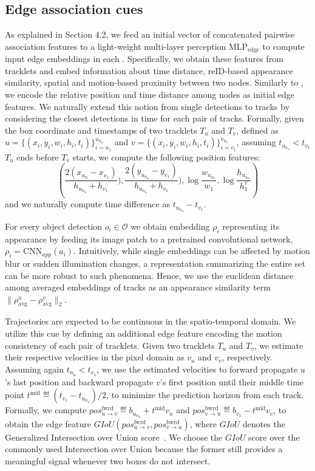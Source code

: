 \documentclass[10pt,twocolumn,letterpaper]{article}
\begin{document}
{{\subsection{Edge association cues}
As explained in Section 4.2, we feed an initial vector of concatenated pairwise association features to a light-weight multi-layer perception $\text{MLP}_{\text{edge}}$ to compute input edge embeddings in each \blockname. Specifically, we obtain these features from tracklets and embed information about time distance, reID-based appearance similarity, spatial and motion-based proximity between two nodes. 
 Similarly to \cite{mpntrack}, we encode the relative position and time distance among nodes as initial edge features. We naturally extend this notion from single detections to tracks by considering the closest detections in time for each pair of tracks. Formally, given the box coordinate and timestamps of two tracklets $T_u$ and $T_v$, defined as 
$u=\{(x_i, y_i, w_i, h_i, t_i)\}_{i=u_1}^{u_{n_u}}$ and
$v=\{(x_i, y_i, w_i, h_i, t_i)\}_{i=v_1}^{v_{n_v}}$, assuming $t_{u_{n_u}}< t_{v_1}$ \ie $T_u$ ends before $T_v$ starts, we compute the following position features:
$$ \left ( \frac{2(x_{n_u} - x_{v_1})}{h_{u_{n_u}} +  h_{v_1}}), \frac{2(y_{u_{n_u}} - y_{v_1})}{h_{u_{n_u}} +  h_{v_1}}), \log{ \frac{w_{u_{n_u}}}{ w_{1}}}, \log{ \frac{h_{u_{n_u}}}{ h^v_{1}}}  \right )$$ 
and we naturally compute time difference as $t_{u_{n_u}} - t_{v_1}$.


 For every object detection $o_i\in \mathcal{O}$ we obtain embedding $\rho_i$ representing its appearance by feeding its image patch to a pretrained convolutional network, $\rho_i=\text{CNN}_{app}(a_i)$. Intuitively, while single embeddings can be affected by motion blur or sudden illumination changes, a representation summarizing the entire set can be more robust to such phenomena. Hence, we use the euclidean distance among averaged embeddings of tracks as an appearance similarity term   $\lVert\rho^u_{\text{avg}}- \rho^v_{\text{avg}}\rVert_2$.


 Trajectories are expected to be continuous in the spatio-temporal domain. We utilize this cue  by defining an additional edge feature encoding the motion consistency of each pair of tracklets. Given two tracklets $T_u$ and $T_v$, we estimate their respective velocities in the pixel domain as $v_u$ and $v_v$, respectively. Assuming again $t_{n_u}< t_{v_1}$, we use the estimated velocities to forward propagate $u$'s last position and backward propagate $v$'s first position until their middle time point $t^{\text{mid}} \eqdef (t_{v_1} - t_{u_{n_u}}) / 2$, to minimize the prediction horizon from each track. Formally, we compute $pos_{u\rightarrow v}^{\text{fwrd}} \eqdef b_{u_{n_u}} + t^{\text{mid}}v_u$ and $pos_{v\rightarrow u}^{\text{bwrd}} \eqdef b_{v_1} - t^{\text{mid}}v_v$, to obtain the edge feature $GIoU(pos_{u\rightarrow v}^{\text{fwrd}}, pos_{v\rightarrow u}^{\text{bwrd}})$, where $GIoU$ denotes the Generalized Intersection over Union score~\cite{rezatofighi2019generalized}. We choose the $GIoU$ score over the commonly used Intersection over Union because the former still provides a meaningful signal whenever two boxes do not intersect.

}}
\end{document}
